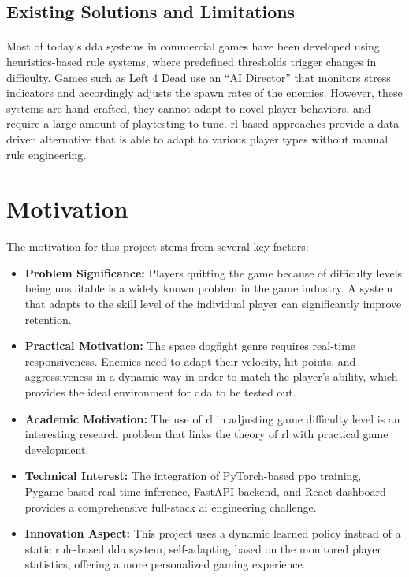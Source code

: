 \subsection{Existing Solutions and Limitations}
\paragraph{} Most of today's \ac{dda} systems in commercial games have been developed using heuristics-based rule systems, where predefined thresholds trigger changes in difficulty. Games such as Left 4 Dead use an ``AI Director'' that monitors stress indicators and accordingly adjusts the spawn rates of the enemies. However, these systems are hand-crafted, they cannot adapt to novel player behaviors, and require a large amount of playtesting to tune. \ac{rl}-based approaches provide a data-driven alternative that is able to adapt to various player types without manual rule engineering.

\section{Motivation}
The motivation for this project stems from several key factors:

\begin{itemize}
	\item \textbf{Problem Significance:} Players quitting the game because of difficulty levels being unsuitable is a widely known problem in the game industry. A system that adapts to the skill level of the individual player can significantly improve retention.
	\item \textbf{Practical Motivation:} The space dogfight genre requires real-time responsiveness. Enemies need to adapt their velocity, hit points, and aggressiveness in a dynamic way in order to match the player's ability, which provides the ideal environment for \ac{dda} to be tested out.
	\item \textbf{Academic Motivation:} The use of \ac{rl} in adjusting game difficulty level is an interesting research problem that links the theory of \ac{rl} with practical game development.
	\item \textbf{Technical Interest:} The integration of PyTorch-based \ac{ppo} training, Pygame-based real-time inference, FastAPI backend, and React dashboard provides a comprehensive full-stack \ac{ai} engineering challenge.
	\item \textbf{Innovation Aspect:} This project uses a dynamic learned policy instead of a static rule-based \ac{dda} system, self-adapting based on the monitored player statistics, offering a more personalized gaming experience.
\end{itemize}

